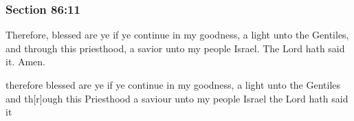 	\subsubsection{Section 86:11} %
		\label{DC86-11}

		Therefore, blessed are ye if ye continue in my goodness, a light unto the Gentiles, and through this priesthood, a savior unto my people Israel.  The Lord hath said it.  Amen.

		\begin{framed}
		\scriptsize
			\begin{compactdesc}
				\item[JSP] therefore blessed are ye if ye continue in my goodness, a light unto the Gentiles and th[r]ough this Priesthood a saviour unto my people Israel the Lord hath said it
			\end{compactdesc}
		\end{framed}